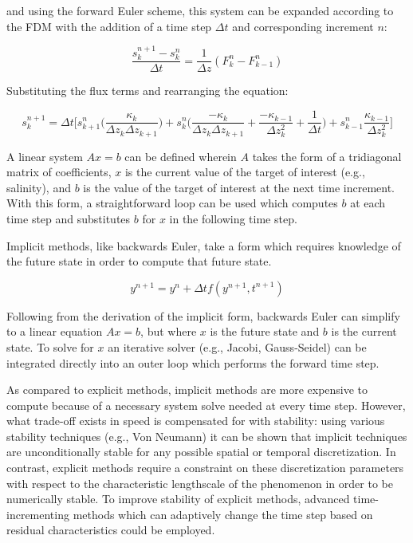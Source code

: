 \noindent and using the forward Euler scheme, this system can be expanded according to the FDM with the addition of a time step $\Delta t$ and corresponding increment $n$:

\begin{equation*}
	\frac{s_k^{n+1} - s_k^{n}}{\Delta t} = \frac{1}{\Delta z}(F_k^n - F_{k-1}^n)
\end{equation*}

Substituting the flux terms and rearranging the equation:

\begin{equation}
	s_k^{n+1} = \Delta t\Big[s_{k+1}^n\Big(\frac{\kappa_k}{\Delta z_k \Delta z_{k+1}}\Big) + s_k^n\Big(\frac{-\kappa_k}{\Delta z_k \Delta z_{k+1}}+\frac{-\kappa_{k-1}}{\Delta z_k^2} + \frac{1}{\Delta t}\Big) + s_{k-1}^n\frac{\kappa_{k-1}}{\Delta z_k^2}\Big]
\end{equation}

A linear system $Ax = b$ can be defined wherein $A$ takes the form of a tridiagonal matrix of coefficients, $x$ is the current value of the target of interest (e.g., salinity), and $b$ is the value of the target of interest at the next time increment. With this form, a straightforward loop can be used which computes $b$ at each time step and substitutes $b$ for $x$ in the following time step. 

Implicit methods, like backwards Euler, take a form which requires knowledge of the future state in order to compute that future state.

\begin{equation}
	y^{n+1} = y^n + \Delta t f(y^{n+1},t^{n+1})
\end{equation}
 
Following from the derivation of the implicit form, backwards Euler can simplify to a linear equation $Ax = b$, but where $x$ is the future state and $b$ is the current state. To solve for $x$ an iterative solver (e.g., Jacobi\autocite{forsythe1960cyclic}, Gauss-Seidel\autocite{usui1994adaptive}) can be integrated directly into an outer loop which performs the forward time step.

As compared to explicit methods, implicit methods are more expensive to compute because of a necessary system solve needed at every time step. However, what trade-off exists in speed is compensated for with stability: using various stability techniques (e.g., Von Neumann\autocite{wesseling1996neumann}) it can be shown that implicit techniques are unconditionally stable for any possible spatial or temporal discretization. In contrast, explicit methods require a constraint on these discretization parameters with respect to the characteristic lengthscale of the phenomenon in order to be numerically stable. To improve stability of explicit methods, advanced time-incrementing methods which can adaptively change the time step based on residual characteristics could be employed.

